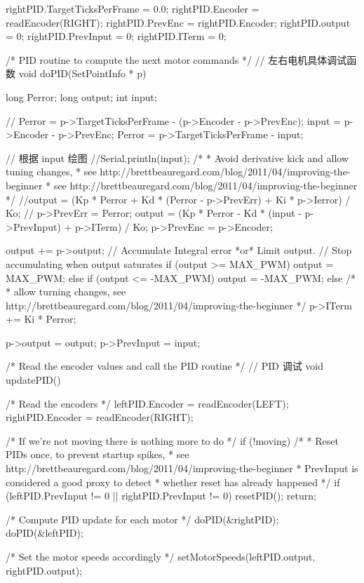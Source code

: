 \documentclass[openany, fontset=windowsold]{ctexbook}
\theoremstyle{kaiti}
\theoremstyle{normal}
\begin{document}
\begin{cpp}
{    rightPID.TargetTicksPerFrame = 0.0;
    rightPID.Encoder = readEncoder(RIGHT);
    rightPID.PrevEnc = rightPID.Encoder;
    rightPID.output = 0;
    rightPID.PrevInput = 0;
    rightPID.ITerm = 0;
  }

  /* PID routine to compute the next motor commands */
  // 左右电机具体调试函数
  void doPID(SetPointInfo * p) {
    long Perror;
    long output;
    int input;

    // Perror = p->TargetTicksPerFrame - (p->Encoder - p->PrevEnc);
    input = p->Encoder - p->PrevEnc;
    Perror = p->TargetTicksPerFrame - input;

    // 根据 input 绘图
    //Serial.println(input);
    /*
    * Avoid derivative kick and allow tuning changes,
    * see http://brettbeauregard.com/blog/2011/04/improving-the-beginner%
    * see http://brettbeauregard.com/blog/2011/04/improving-the-beginner%
    */
    //output = (Kp * Perror + Kd * (Perror - p->PrevErr) + Ki * p->Ierror) / Ko;
    // p->PrevErr = Perror;
    output = (Kp * Perror - Kd * (input - p->PrevInput) + p->ITerm) / Ko;
    p->PrevEnc = p->Encoder;

    output += p->output;
    // Accumulate Integral error *or* Limit output.
    // Stop accumulating when output saturates
    if (output >= MAX_PWM)
      output = MAX_PWM;
    else if (output <= -MAX_PWM)
      output = -MAX_PWM;
    else
    /*
    * allow turning changes, see http://brettbeauregard.com/blog/2011/04/improving-the-beginner%
    */
      p->ITerm += Ki * Perror;

    p->output = output;
    p->PrevInput = input;
  }

  /* Read the encoder values and call the PID routine */
  // PID 调试
  void updatePID() {
    /* Read the encoders */
    leftPID.Encoder = readEncoder(LEFT);
    rightPID.Encoder = readEncoder(RIGHT);

    /* If we're not moving there is nothing more to do */
    if (!moving){
      /*
      * Reset PIDs once, to prevent startup spikes,
      * see http://brettbeauregard.com/blog/2011/04/improving-the-beginner%
      * PrevInput is considered a good proxy to detect
      * whether reset has already happened
      */
      if (leftPID.PrevInput != 0 || rightPID.PrevInput != 0) resetPID();
      return;
    }

    /* Compute PID update for each motor */
    doPID(&rightPID);
    doPID(&leftPID);

    /* Set the motor speeds accordingly */
    setMotorSpeeds(leftPID.output, rightPID.output);
  }
\end{cpp}
\end{document}
